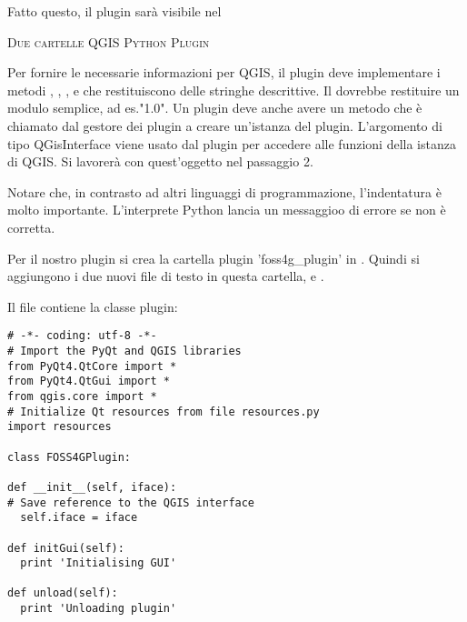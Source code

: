 Fatto questo, il plugin sarà visibile nel 

\begin{Tip}\caption{\textsc{Due cartelle QGIS Python Plugin}}
\end{Tip}

Per fornire le necessarie informazioni per QGIS, il plugin deve implementare i metodi , , ,
 e  che restituiscono delle stringhe descrittive.
Il  dovrebbe restituire un modulo semplice, ad es."1.0". Un plugin deve anche avere un metodo
 che è chiamato dal gestore dei plugin a creare un'istanza del plugin. L'argomento di tipo QGisInterface viene usato dal plugin per accedere alle funzioni della istanza di QGIS. Si lavorerà con quest'oggetto nel passaggio 2.

Notare che, in contrasto ad altri linguaggi di programmazione, l'indentatura è molto importante. L'interprete Python lancia un messaggioo di errore se non è corretta.

Per il nostro plugin si crea la cartella plugin 'foss4g\_plugin' in
. Quindi si aggiungono i due nuovi file di testo in questa cartella,  e .

Il file  contiene la classe plugin:

\begin{verbatim}
# -*- coding: utf-8 -*-
# Import the PyQt and QGIS libraries
from PyQt4.QtCore import *
from PyQt4.QtGui import *
from qgis.core import *
# Initialize Qt resources from file resources.py
import resources

class FOSS4GPlugin:

def __init__(self, iface):
# Save reference to the QGIS interface
  self.iface = iface

def initGui(self):
  print 'Initialising GUI'

def unload(self):
  print 'Unloading plugin'
\end{verbatim}

